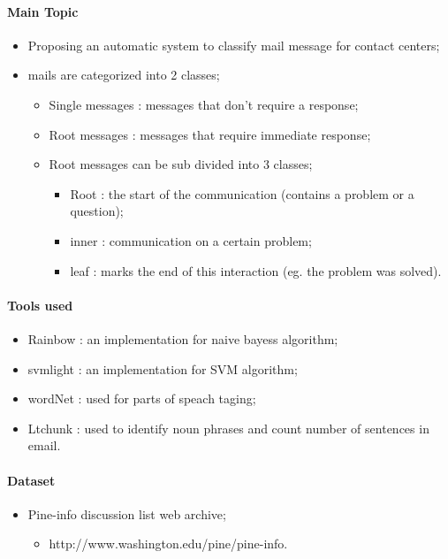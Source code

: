 \documentclass[12pt]{article}
\begin{document}
\paragraph{Main Topic}
\begin{itemize}
    \item Proposing an automatic system to classify mail message for contact centers;
    \item mails are categorized into 2 classes;
    \begin{itemize}
        \item Single messages : messages that don’t require a response;
        \item Root messages : messages that require immediate response;
        \item Root messages can be sub divided into 3 classes;
        \begin{itemize}
            \item Root : the start of the communication (contains a problem or a question);
            \item inner : communication on a certain problem;
            \item leaf : marks the end of this interaction (eg. the problem was solved).
        \end{itemize}
    \end{itemize}
\end{itemize}

\paragraph{Tools used}
\begin{itemize}
    \item Rainbow : an implementation for naive bayess algorithm;
    \item svmlight : an implementation for SVM algorithm;
    \item wordNet : used for parts of speach taging;
    \item Ltchunk : used to identify noun phrases and count number of sentences in email.
\end{itemize}

\paragraph{Dataset}
\begin{itemize}
    \item Pine-info discussion list web archive;
    \begin{itemize}
        \item http://www.washington.edu/pine/pine-info.
    \end{itemize}
\end{itemize}
\end{document}
